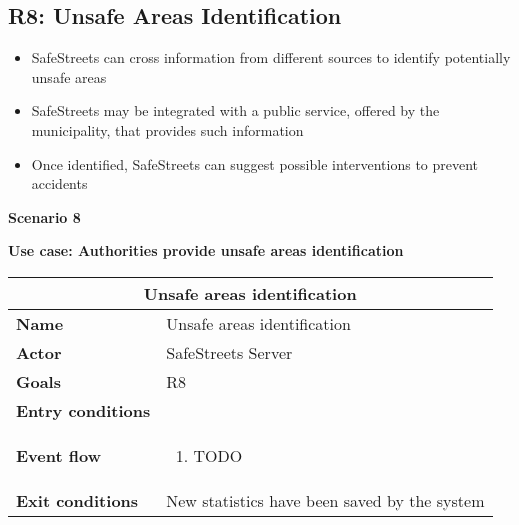 \subsection{R8: Unsafe Areas Identification}
\begin{itemize}
  \item SafeStreets can cross information from different sources to identify potentially unsafe areas
  \item SafeStreets may be integrated with a public service, offered by the municipality, that provides such information
  \item Once identified, SafeStreets can suggest possible interventions to prevent accidents
\end{itemize}
\begin{description}
    \item \textbf{Scenario 8} \newline
        
    \item \textbf{Use case: Authorities provide unsafe areas identification}
    \begin{center}
        \begin{tabular}{|p{3cm}|p{7cm}|}
            \multicolumn{2}{c}{\textbf{Unsafe areas identification}} \\
            \hline
            \textbf{Name} & Unsafe areas identification \\
            \hline
            \textbf{Actor} & SafeStreets Server \\
            \hline
            \textbf{Goals} & R8 \\
            \hline
            \textbf{Entry conditions} &  \\
            \hline
            \textbf{Event flow} &
            \begin{enumerate}
                \item TODO
            \end{enumerate} \\
            \hline
            \textbf{Exit conditions} & New statistics have been saved by the system \\
            \hline
        \end{tabular}
    \end{center}
\end{description}

